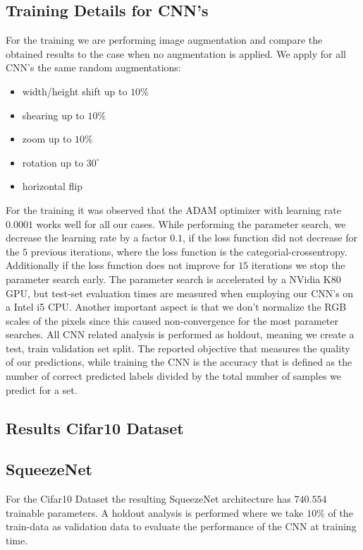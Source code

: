 \documentclass[11pt]{article}
\begin{document}
\subsection{Training Details for CNN's}
For the training we are performing image augmentation and compare the obtained results to the case when no augmentation is applied. We apply for all CNN's the same random augmentations:
%
\begin{itemize}
	\item width/height shift up to $10\%$
	\item shearing up to $10\%$
	\item zoom up to $10\%$
	\item rotation up to $30^\circ$
	\item horizontal flip
\end{itemize}
%
For the training it was observed that the ADAM optimizer with learning rate $0.0001$ works well for all our cases. While performing the parameter search, we decrease the learning rate by a factor $0.1$, if the loss function did not decrease for the $5$ previous iterations, where the loss function is the categorial-crossentropy. Additionally if the loss function does not improve for $15$ iterations we stop the parameter search early. The parameter search is accelerated by a NVidia K80 GPU, but test-set evaluation times are measured when employing our CNN's on a Intel i5 CPU. Another important aspect is that we don't normalize the RGB scales of the pixels since this caused non-convergence for the most parameter searches. All CNN related analysis is performed as holdout, meaning we create a test, train validation set split. The reported objective that measures the quality of our predictions, while training the CNN is the accuracy that is defined as the number of correct predicted labels divided by the total number of samples we predict for a set. 



\subsection{Results Cifar10 Dataset}

\subsection{SqueezeNet}
For the Cifar10 Dataset the resulting SqueezeNet architecture has $740.554$ trainable parameters.
A holdout analysis is performed where we take $10\%$ of the train-data as validation data to evaluate the performance of the CNN at training time.
\end{document}
